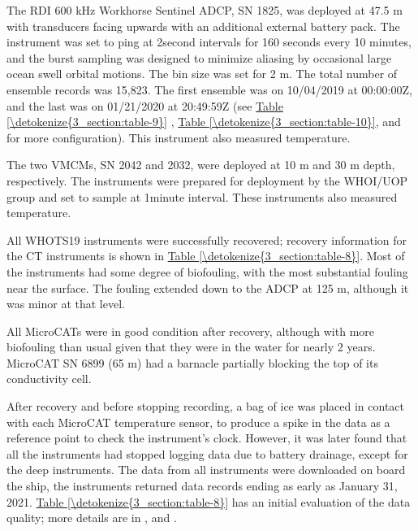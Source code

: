 \documentclass[a4paper,10pt,english,openany,oneside]{sphinxmanual}
\begin{document}
\sphinxAtStartPar
The RDI 600 kHz Workhorse Sentinel ADCP, SN 1825, was deployed at 47.5 m with
transducers facing upwards with an additional external battery pack. The
instrument was set to ping at 2\sphinxhyphen{}second intervals for 160 seconds every 10
minutes, and the burst sampling was designed to minimize aliasing by occasional
large ocean swell orbital motions. The bin size was set for 2 m. The total
number of ensemble records was 15,823. The first ensemble was on 10/04/2019 at
00:00:00Z, and the last was on 01/21/2020 at 20:49:59Z (see \hyperref[\detokenize{3_section:table-9}]{Table \ref{\detokenize{3_section:table-9}}}
, \hyperref[\detokenize{3_section:table-10}]{Table \ref{\detokenize{3_section:table-10}}}, and {\hyperref[\detokenize{appendices:whots-19-600-khz-serial-1825}]{}}
for more configuration). This instrument also measured temperature.

\sphinxAtStartPar
The two VMCMs, SN 2042 and 2032, were deployed at 10 m and 30 m depth,
respectively. The instruments were prepared for deployment by the WHOI/UOP
group and set to sample at 1\sphinxhyphen{}minute interval. These instruments also
measured temperature.

\sphinxAtStartPar
All WHOTS\sphinxhyphen{}19 instruments were successfully recovered; recovery information for
the C\sphinxhyphen{}T instruments is shown in \hyperref[\detokenize{3_section:table-8}]{Table \ref{\detokenize{3_section:table-8}}}. Most of the instruments had
some degree of biofouling, with the most substantial fouling near the surface.
The fouling extended down to the ADCP at 125 m, although it was minor at that
level.

\sphinxAtStartPar
All MicroCATs were in good condition after recovery, although with more
biofouling than usual given that they were in the water for nearly 2 years.
MicroCAT SN 6899 (65 m) had a barnacle partially blocking the top of its
conductivity cell.

\sphinxAtStartPar
After recovery and before stopping recording, a bag of ice was placed in
contact with each MicroCAT temperature sensor, to produce a spike in the data
as a reference point to check the instrument’s clock. However, it was later
found that all the instruments had stopped logging data due to battery
drainage, except for the deep instruments. The data from all instruments were
downloaded on board the ship, the instruments returned data records ending as
early as January 31, 2021. \hyperref[\detokenize{3_section:table-8}]{Table \ref{\detokenize{3_section:table-8}}} has an initial evaluation of the
data quality; more details are in
{\hyperref[\detokenize{5_section:microcat-data-processing-procedures}]{}}, and
{\hyperref[\detokenize{6_section:microcat-data}]{}}.
\end{document}
